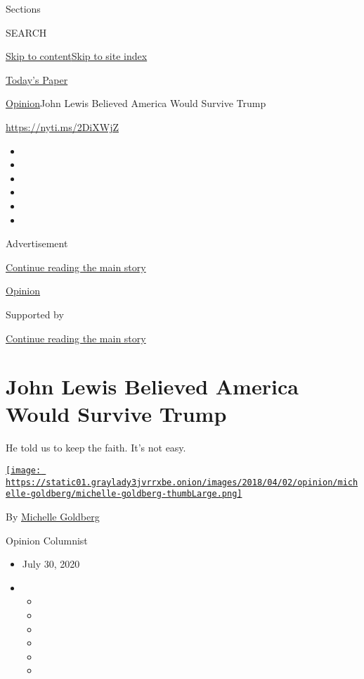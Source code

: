 Sections

SEARCH

\protect\hyperlink{site-content}{Skip to
content}\protect\hyperlink{site-index}{Skip to site index}

\href{https://myaccount.nytimes3xbfgragh.onion/auth/login?response_type=cookie\&client_id=vi}{}

\href{https://www.nytimes3xbfgragh.onion/section/todayspaper}{Today's
Paper}

\href{/section/opinion}{Opinion}\textbar{}John Lewis Believed America
Would Survive Trump

\url{https://nyti.ms/2DiXWjZ}

\begin{itemize}
\item
\item
\item
\item
\item
\item
\end{itemize}

Advertisement

\protect\hyperlink{after-top}{Continue reading the main story}

\href{/section/opinion}{Opinion}

Supported by

\protect\hyperlink{after-sponsor}{Continue reading the main story}

\hypertarget{john-lewis-believed-america-would-survive-trump}{%
\section{John Lewis Believed America Would Survive
Trump}\label{john-lewis-believed-america-would-survive-trump}}

He told us to keep the faith. It's not easy.

\href{https://www.nytimes3xbfgragh.onion/by/michelle-goldberg}{\texttt{[image: https://static01.graylady3jvrrxbe.onion/images/2018/04/02/opinion/michelle-goldberg/michelle-goldberg-thumbLarge.png]}}

By
\href{https://www.nytimes3xbfgragh.onion/by/michelle-goldberg}{Michelle
Goldberg}

Opinion Columnist

\begin{itemize}
\item
  July 30, 2020
\item
  \begin{itemize}
  \item
  \item
  \item
  \item
  \item
  \item
  \end{itemize}
\end{itemize}

